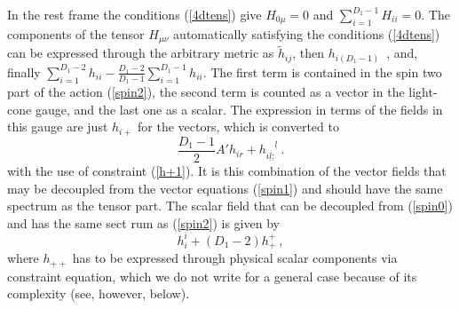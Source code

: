 \documentclass[a4paper,12pt]{article}
\begin{document}
In the rest frame the conditions (\ref{4dtens}) give $H_{0\mu} =0$
and $\sum_{i=1}^{D_1-1} H_{ii}=0$. The components of the tensor
$H_{\mu\nu}$ automatically satisfying the conditions (\ref{4dtens}) can
be expressed through the arbitrary metric as
$\tilde{h}_{ij}$, then $h_{i(D_1-1)}$~, and, finally
$\sum_{i=1}^{D_1-2} h_{ii}-\frac{D_1-2}{D_1-1}\sum_{i=1}^{D_1-1}
h_{ii}$. The first term is contained in the spin two part of
the action (\ref{spin2}), the second term is counted as a vector
in the light-cone gauge, and the last one as a scalar. The expression
in terms of the fields in this gauge are just $h_{i+}$ for the
vectors, which is converted to
\begin{equation}
\frac{D_1-1}{2} A'h_{ir}  + h_{i\underline l ;}^{\quad\underline l}~.
\label{grvect}
\end{equation}
with the use of constraint (\ref{h+1}). It is this combination of
the vector fields that may be decoupled from the vector equations
(\ref{spin1}) and should have the same spectrum as the tensor
part. The scalar field that can be decoupled from (\ref{spin0})
and has the same sect rum as (\ref{spin2}) is given by
\begin{equation}
h^i_i+(D_1-2)h^+_+~,
\label{grsc}
\end{equation}
where $h_{++}$ has to be expressed through physical scalar components
via constraint equation, which we do not write for a general case
because of its complexity (see, however, below).
\end{document}
